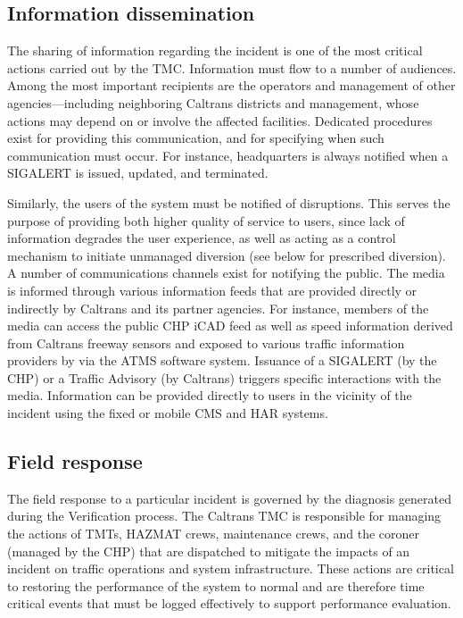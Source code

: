 \documentclass[12pt]{report}
\newcounter{time}
\begin{document}
\subsection{Information dissemination}
\label{sec:inf-dis}

The sharing of information regarding the incident is one of the most critical
actions carried out by the \ac{TMC}.  Information must flow to a number of audiences.
Among the most important recipients are the operators and management of other
agencies---including neighboring Caltrans districts and management, whose
actions may depend on or involve the affected facilities.  Dedicated procedures
exist for providing this communication, and for specifying when such
communication must occur.  For instance, headquarters is always notified when a
SIGALERT is issued, updated, and terminated.

Similarly, the users of the system must be notified of disruptions.
This serves the purpose of providing both higher quality of service to
users, since lack of information degrades the user experience, as well
as acting as a control mechanism to initiate unmanaged diversion (see
below for prescribed diversion).  A number of communications channels
exist for notifying the public.  The media is informed through various
information feeds that are provided directly or indirectly by Caltrans
and its partner agencies.  For instance, members of the media can
access the public \ac{CHP} \ac{iCAD} feed as well as speed information
derived from Caltrans freeway sensors and exposed to various traffic
information providers by via the \ac{ATMS} software system.  Issuance
of a SIGALERT (by the \ac{CHP}) or a Traffic Advisory (by Caltrans)
triggers specific interactions with the media.  Information can be
provided directly to users in the vicinity of the incident using the
fixed or mobile \ac{CMS} and \ac{HAR} systems.

\subsection{Field response}
\label{sec:field-response}

The field response to a particular incident is governed by the
diagnosis generated during the {\sc Verification} process.  The
Caltrans \ac{TMC} is responsible for managing the actions of
\acp{TMT}, \ac{HAZMAT} crews, maintenance crews, and the coroner
(managed by the \ac{CHP}) that are dispatched to mitigate the impacts
of an incident on traffic operations and system infrastructure.  These
actions are critical to restoring the performance of the system to
normal and are therefore time critical events that must be logged
effectively to support performance evaluation.
\end{document}

